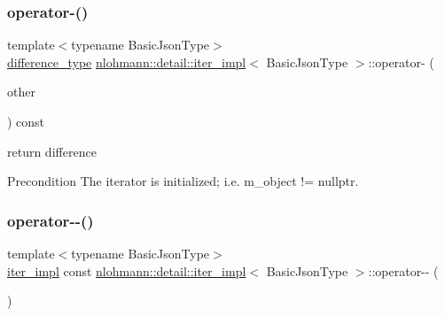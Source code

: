 \subsubsection{\texorpdfstring{operator-\/()}{operator-()}\hspace{0.1cm}{\footnotesize\ttfamily [2/2]}}
{\footnotesize\ttfamily template$<$typename Basic\+Json\+Type$>$ \\
\mbox{\hyperlink{classnlohmann_1_1detail_1_1iter__impl_a2f7ea9f7022850809c60fc3263775840}{difference\+\_\+type}} \mbox{\hyperlink{classnlohmann_1_1detail_1_1iter__impl}{nlohmann\+::detail\+::iter\+\_\+impl}}$<$ Basic\+Json\+Type $>$\+::operator-\/ (\begin{DoxyParamCaption}\item[{const \mbox{\hyperlink{classnlohmann_1_1detail_1_1iter__impl}{iter\+\_\+impl}}$<$ Basic\+Json\+Type $>$ \&}]{other }\end{DoxyParamCaption}) const\hspace{0.3cm}{\ttfamily [inline]}}



return difference 

\begin{DoxyPrecond}{Precondition}
The iterator is initialized; i.\+e. {\ttfamily m\+\_\+object != nullptr}. 
\end{DoxyPrecond}
\mbox{\label{classnlohmann_1_1detail_1_1iter__impl_a1fc43e764467b8ea4a4cdd01f629d757}} 
\subsubsection{\texorpdfstring{operator-\/-\/()}{operator--()}\hspace{0.1cm}{\footnotesize\ttfamily [1/2]}}
{\footnotesize\ttfamily template$<$typename Basic\+Json\+Type$>$ \\
\mbox{\hyperlink{classnlohmann_1_1detail_1_1iter__impl}{iter\+\_\+impl}} const \mbox{\hyperlink{classnlohmann_1_1detail_1_1iter__impl}{nlohmann\+::detail\+::iter\+\_\+impl}}$<$ Basic\+Json\+Type $>$\+::operator-\/-\/ (\begin{DoxyParamCaption}\item[{int}]{ }\end{DoxyParamCaption})\hspace{0.3cm}{\ttfamily [inline]}}



